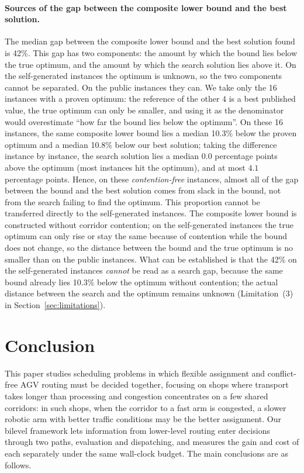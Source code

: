 \documentclass[manuscript,screen,review]{acmart}
\newcommand{\LBGapMed}{42\%}
\newcommand{\PubNOpt}{16}                 %
\newcommand{\PubLBSlack}{10.3\%}          %
\newcommand{\PubLBTotal}{10.8\%}          %
\newcommand{\PubLBResidMed}{0.0}          %
\newcommand{\PubLBResidMax}{4.1}          %
\begin{document}
\paragraph{Sources of the gap between the composite lower bound and the best solution.}
The median gap between the composite lower bound and the best solution found is \LBGapMed{}. This gap has two components: the amount by which the bound lies below the true optimum, and the amount by which the search solution lies above it. On the self-generated instances the optimum is unknown, so the two components cannot be separated.
On the public instances they can. We take only the \PubNOpt{} instances with a proven optimum: the reference of the other $4$ is a best published value, the true optimum can only be smaller, and using it as the denominator would overestimate ``how far the bound lies below the optimum''.
On these \PubNOpt{} instances, the same composite lower bound lies a median \PubLBSlack{} below the proven optimum and a median \PubLBTotal{} below our best solution; taking the difference instance by instance, the search solution lies a median $\PubLBResidMed$ percentage points above the optimum (most instances hit the optimum), and at most $\PubLBResidMax$ percentage points.
Hence, on these \emph{contention-free} instances, almost all of the gap between the bound and the best solution comes from slack in the bound, not from the search failing to find the optimum.
This proportion cannot be transferred directly to the self-generated instances. The composite lower bound is constructed without corridor contention; on the self-generated instances the true optimum can only rise or stay the same because of contention while the bound does not change, so the distance between the bound and the true optimum is no smaller than on the public instances.
What can be established is that the \LBGapMed{} on the self-generated instances \emph{cannot} be read as a search gap, because the same bound already lies \PubLBSlack{} below the optimum without contention; the actual distance between the search and the optimum remains unknown (Limitation~(3) in Section~\ref{sec:limitations}).



\section{Conclusion}

This paper studies scheduling problems in which flexible assignment and conflict-free AGV routing must be decided together, focusing on shops where transport takes longer than processing and congestion concentrates on a few shared corridors: in such shops, when the corridor to a fast arm is congested, a slower robotic arm with better traffic conditions may be the better assignment. Our bilevel framework lets information from lower-level routing enter decisions through two paths, evaluation and dispatching, and measures the gain and cost of each separately under the same wall-clock budget. The main conclusions are as follows.
\end{document}

